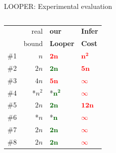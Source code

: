 \documentclass[10pt, usenames, dvipsnames, aspectratio=169]{beamer}
\newcommand{\bad}[1]{\textcolor{red}{\textbf{#1}}}
\newcommand{\good}[1]{\textcolor{darkgreen}{\textbf{#1}}}
\begin{document}
\begin{frame}{LOOPER: Experimental evaluation}
\begin{columns}
\begin{column}{0.45 \textwidth}
            \def\arraystretch{1.1}
            \begin{tabular}{crR{1.5cm}R{1cm}}
                & real & \alert{\textbf{our}} & \textbf{Infer} \\[-2mm]
                & bound & \alert{\textbf{Looper}} & \textbf{Cost} \\
                \hline
                \#1 & $n$ & \bad{$\bm{2n}$} & \bad{$\bm{n^2}$} \\
                \hline
                \#2 & $2n$ & \good{$\bm{2n}$} & \bad{$\bm{5n}$} \\
                \hline
                \#3 & $4n$ & \bad{$\bm{5n}$} & \bad{$\bm{\infty}$} \\
                \hline
                \#4 & *$n^2$ & *\good{$\bm{n^2}$} & \bad{$\bm{\infty}$} \\
                \hline
                \#5 & $2n$ & \good{$\bm{2n}$} & \bad{$\bm{12n}$} \\
                \hline
                \#6 & *$n$ & *\good{$\bm{n}$} & \bad{$\bm{\infty}$} \\
                \hline
                \#7 & $2n$ & \good{$\bm{2n}$} & \bad{$\bm{\infty}$} \\
                \hline
                \#8 & $2n$ & \good{$\bm{2n}$} & \bad{$\bm{\infty}$} \\
                \hline
            \end{tabular}
        \end{column}
    \end{columns}
\end{frame}
\end{document}
